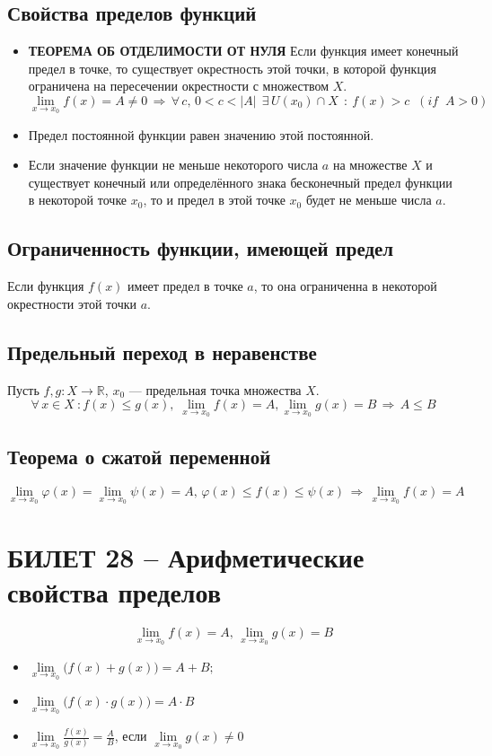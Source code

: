 \documentclass{article}
\newcommand{\R}{\mathbb R}
\begin{document}
\subsection{Свойства пределов функций}
\begin{itemize}
    \item \textbf{ТЕОРЕМА ОБ ОТДЕЛИМОСТИ ОТ НУЛЯ} Если функция имеет конечный предел в точке, то существует окрестность этой точки, в которой функция ограничена на пересечении окрестности с множеством $X$.
    $$ \lim_{x\to x_0} f(x)=A\neq 0\,\Rightarrow\,\forall \,c,\,0<c<|A|\:\:\exists\,U(x_0)\cap X\:\: :\: f(x)>c \;\; (if \;\; A>0) $$
    \item Предел постоянной функции равен значению этой постоянной.
    \item Если значение функции не меньше некоторого числа $a$ на множестве $X$ и существует конечный или определённого знака бесконечный предел функции в некоторой точке $x_0$, то и предел в этой точке $x_0$ будет не меньше числа $a$.
\end{itemize}
\subsection{Ограниченность функции, имеющей предел}
Если функция $f(x)$ имеет предел в точке $a$, то она ограниченна в некоторой окрестности этой точки $a$.
\subsection{Предельный переход в неравенстве}
Пусть $f,g:X\to\R$, $x_0$ — предельная точка множества $X$.
$$\forall\, x\in X\:: f(x)\leqslant g(x),\;\lim_{x\to x_0}f(x)=A,\lim_{x\to x_0}g(x)=B\,\Rightarrow\, A\leqslant B$$
\subsection{Теорема о сжатой переменной}
$$ \lim_{x\to x_0} \varphi (x)=\lim_{x\to x_0} \psi(x)=A,\, \varphi(x)\leqslant f(x)\leqslant\psi(x)\,\Rightarrow\,\lim_{x\to x_0} f(x)=A $$
\newpage
\section{БИЛЕТ 28 -- Арифметические свойства пределов}
$$ \lim_{x\to x_0} f(x)=A,\, \lim_{x\to x_0} g(x)=B $$
\begin{itemize}
    \item $\lim\limits_{x\to x_0} \big( f(x)+g(x)\big) =A+B;$
    \item $ \lim\limits_{x\to x_0} \big( f(x)\cdot g(x)\big) = A\cdot B $
    \item $\lim\limits_{x\to x_0} \frac{f(x)}{g(x)}=\frac{A}{B}$, если $\lim\limits_{x\to x_0}g(x)\neq 0$
\end{itemize}
\newpage
\end{document}
